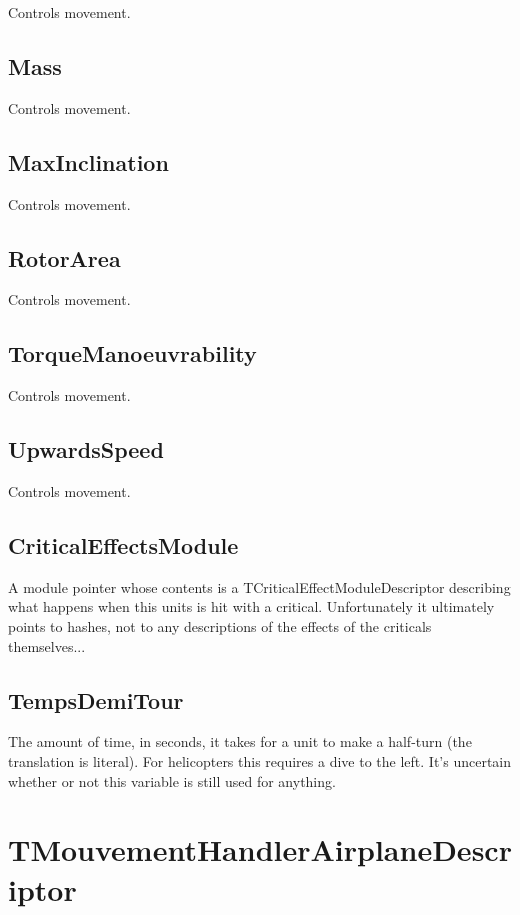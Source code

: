 \documentclass{article}
\begin{document}
Controls movement.

\subsection{Mass}

Controls movement.

\subsection{MaxInclination}

Controls movement.

\subsection{RotorArea}

Controls movement.

\subsection{TorqueManoeuvrability}

Controls movement.

\subsection{UpwardsSpeed}

Controls movement.

\subsection{CriticalEffectsModule}

A module pointer whose contents is a TCriticalEffectModuleDescriptor describing what happens when this units is hit with a critical. Unfortunately it ultimately points to hashes, not to any descriptions of the effects of the criticals themselves...

\subsection{TempsDemiTour}

The amount of time, in seconds, it takes for a unit to make a half-turn (the translation is literal). For helicopters this requires a dive to the left. It's uncertain whether or not this variable is still used for anything.

\section{TMouvementHandlerAirplaneDescriptor}
\end{document}
